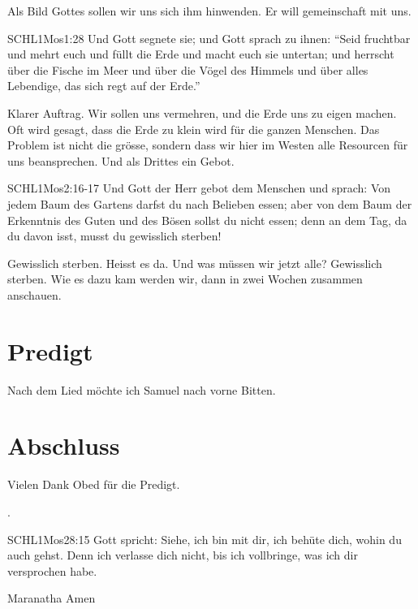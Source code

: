 \documentclass{../../inc/mybib}
\begin{document}
\begin{spacing}{1.5}
\begin{block}
    Als Bild Gottes sollen wir uns sich ihm hinwenden. Er will gemeinschaft mit uns.

    \begin{bibelbox}{SCHL}{1Mos}{1:28}
        Und Gott segnete sie; und Gott sprach zu ihnen: \enquote{Seid fruchtbar und mehrt euch und füllt die Erde und macht euch sie untertan; und herrscht über die Fische im Meer und über die Vögel des Himmels und über alles Lebendige, das sich regt auf der Erde.}
    \end{bibelbox}

    Klarer Auftrag. Wir sollen uns vermehren, und die Erde uns zu eigen machen. Oft wird gesagt, dass die Erde zu klein wird für die ganzen Menschen. Das Problem ist nicht die grösse, sondern dass wir hier im Westen alle Resourcen für uns beansprechen.
    Und als Drittes ein Gebot.

    \begin{bibelbox}{SCHL}{1Mos}{2:16-17}
        Und Gott der Herr gebot dem Menschen und sprach: \flqq Von jedem Baum des Gartens darfst du nach Belieben essen; aber von dem Baum der Erkenntnis des Guten und des Bösen sollst du nicht essen; denn an dem Tag, da du davon isst, musst du gewisslich sterben!\frqq
    \end{bibelbox}

    Gewisslich sterben. Heisst es da. Und was müssen wir jetzt alle? Gewisslich sterben. Wie es dazu kam werden wir, dann in zwei Wochen zusammen anschauen.
   \end{block}
   
\end{spacing}

\section{Predigt}
Nach dem Lied möchte ich Samuel nach vorne Bitten.





\section{Abschluss}
Vielen Dank Obed für die Predigt.

.

\beten{}

\begin{bibelbox}{SCHL}{1Mos}{28:15}
    Gott spricht: Siehe, ich bin mit dir,
    ich behüte dich, wohin du auch gehst.
    Denn ich verlasse dich nicht,
    bis ich vollbringe, was ich dir versprochen habe.
\end{bibelbox}

Maranatha Amen
\end{document}
